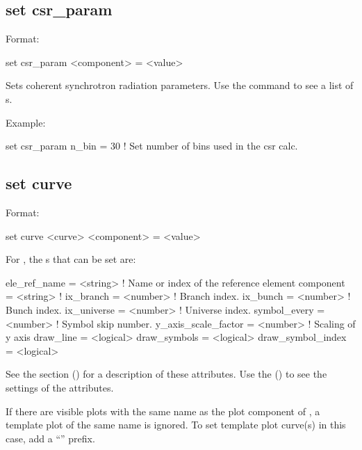{{%

\subsection{set csr_param}
\label{s:set.csr.param}

Format:
\begin{example}
  set csr_param <component> = <value>
\end{example}

Sets coherent synchrotron radiation parameters. Use the 
command to see a list of s.

Example:
\begin{example}
  set csr_param n_bin = 30  ! Set number of bins used in the csr calc.
\end{example}


\subsection{set curve}
\label{s:set.curve}

Format:
\begin{example}
  set curve <curve> <component> = <value>
\end{example}

For , the s that can be set are:
\begin{example}
  ele_ref_name        = <string>  ! Name or index of the reference element
  component           = <string>  ! 
  ix_branch           = <number>  ! Branch index.
  ix_bunch            = <number>  ! Bunch index.
  ix_universe         = <number>  ! Universe index.
  symbol_every        = <number>  ! Symbol skip number.
  y_axis_scale_factor = <number>  ! Scaling of y axis
  draw_line           = <logical> 
  draw_symbols        = <logical> 
  draw_symbol_index   = <logical> 
\end{example}
See the  section () for a description of these attributes.  Use
the  () to see the settings of the attributes.

If there are visible plots with the same name as the plot component of , a template plot
of the same name is ignored. To set template plot curve(s) in this case, add a ``'' prefix.

}}
